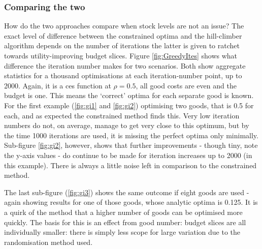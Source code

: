 \subsubsection{Comparing the two}

How do the two approaches compare when stock levels are not an issue? The exact level of difference between the constrained optima and the hill-climber algorithm depends on the number of iterations the latter is given to ratchet towards utility-improving budget slices. Figure \ref{fig:GreedyItes} shows what difference the iteration number makes for two scenarios. Both show aggregate statistics for a thousand optimisations at each iteration-number point, up to 2000. Again, it is a \gls{ces} function at $\rho=0.5$, all good costs are even and the budget is one. This means the `correct' optima for each separate good is known. For the first example (\ref{fig:gi1} and \ref{fig:gi2}) optimising two goods, that is 0.5 for each, and as expected the constrained method finds this. Very low iteration numbers do not, on average, manage to get very close to this optimum, but by the time 1000 iterations are used, it is missing the perfect optima only minimally. Sub-figure \ref{fig:gi2}, however, shows that further improvements - though tiny, note the y-axis values - do continue to be made for iteration increases up to 2000 (in this example). There is always a little noise left in comparison to the constrained method.

The last sub-figure (\ref{fig:gi3}) shows the same outcome if eight goods are used - again showing results for one of those goods, whose analytic optima is 0.125. It is a quirk of the method that a higher number of goods can be optimised more quickly. The basis for this is an effect from good number: budget slices are all individually smaller: there is simply less scope for large variation due to the randomisation method used.

